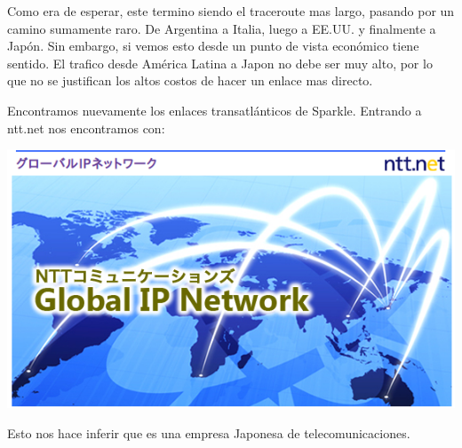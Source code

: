 \begin{table}[H]
\begin{tabular}{@{}l|llll@{}}
 \bottomrule
\end{tabular}
\label{tokyo}
\end{table}

\vspace{10px}

Como era de esperar, este termino siendo el traceroute mas largo, pasando por un camino sumamente raro. De Argentina a Italia, luego a EE.UU. y finalmente a Japón. Sin embargo, si vemos esto desde un punto de vista económico tiene sentido. El trafico desde América Latina a Japon no debe ser muy alto, por lo que no se justifican los altos costos de hacer un enlace mas directo.

Encontramos nuevamente los enlaces transatlánticos de Sparkle. Entrando a ntt.net nos encontramos con:

\includegraphics[width=\textwidth,keepaspectratio]{images/ntt}

Esto nos hace inferir que es una empresa Japonesa de telecomunicaciones.

